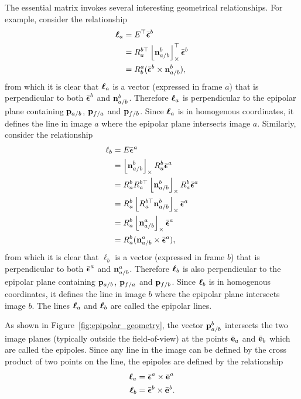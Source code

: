 The essential matrix invokes several interesting geometrical relationships.  For example, consider the relationship
\begin{align*}
\boldsymbol{\ell}_a &= E^\top \bar{\boldsymbol{\epsilon}}^b\\
	&= R_a^{b\top} \left\lfloor\mathbf{n}_{a/b}^b\right\rfloor_{\times}^\top \bar{\boldsymbol{\epsilon}}^b \\
	&= R_b^a (\bar{\boldsymbol{\epsilon}}^b \times \mathbf{n}_{a/b}^b),
\end{align*}
from which it is clear that $\boldsymbol{\ell}_a$ is a vector (expressed in frame $a$) that is perpendicular to both $\bar{\boldsymbol{\epsilon}}^b$ and $\mathbf{n}_{a/b}^b$.  Therefore $\boldsymbol{\ell}_a$ is perpendicular to the epipolar plane containing $\mathbf{p}_{a/b}$, $\mathbf{p}_{f/a}$ and $\mathbf{p}_{f/b}$.  Since $\boldsymbol{\ell}_a$ is in homogenous coordinates, it defines the line in image $a$ where the epipolar plane intersects image $a$.  
%
Similarly, consider the relationship
\begin{align*}
\ell_b &= E \bar{\boldsymbol{\epsilon}}^a \\
       &= \left\lfloor\mathbf{n}_{a/b}^b\right\rfloor_{\times}R_a^b \bar{\boldsymbol{\epsilon}}^a \\
       &= R_a^b R_a^{b\top} \left\lfloor\mathbf{n}_{a/b}^b\right\rfloor_{\times}R_a^b \bar{\boldsymbol{\epsilon}}^a \\
       &= R_a^b \left\lfloor R_a^{b\top}\mathbf{n}_{a/b}^b\right\rfloor_{\times} \bar{\boldsymbol{\epsilon}}^a\\
       &= R_a^b \left\lfloor\mathbf{n}_{a/b}^a\right\rfloor_{\times} \bar{\boldsymbol{\epsilon}}^a \\
       &= R_a^b (\mathbf{n}_{a/b}^a \times \bar{\boldsymbol{\epsilon}}^a),
\end{align*}
from which it is clear that $\ell_b$ is a vector (expressed in frame $b$) that is perpendicular to both $\bar{\boldsymbol{\epsilon}}^a$ and $\mathbf{n}_{a/b}^a$.  Therefore $\boldsymbol{\ell}_b$ is also perpendicular to the epipolar plane containing $\mathbf{p}_{a/b}$, $\mathbf{p}_{f/a}$ and $\mathbf{p}_{f/b}$.  Since $\boldsymbol{\ell}_b$ is in homogenous coordinates, it defines the line in image $b$ where the epipolar plane intersects image $b$.  
%
The lines $\boldsymbol{\ell}_a$ and $\boldsymbol{\ell}_b$ are called the epipolar lines.  

As shown in Figure~\ref{fig:epipolar_geometry}, the vector $\mathbf{p}_{a/b}^b$ intersects the two image planes (typically outside the field-of-view) at the points $\bar{\mathbf{e}}_a$ and $\bar{\mathbf{e}}_b$ which are called the epipoles.  Since any line in the image can be defined by the cross product of two points on the line, the epipoles are defined by the relationship
\begin{align*}
\boldsymbol{\ell}_a &= \bar{\boldsymbol{\epsilon}}^a \times \bar{\mathbf{e}}^a \\
\boldsymbol{\ell}_b &= \bar{\boldsymbol{\epsilon}}^b \times \bar{\mathbf{e}}^b.
\end{align*}

